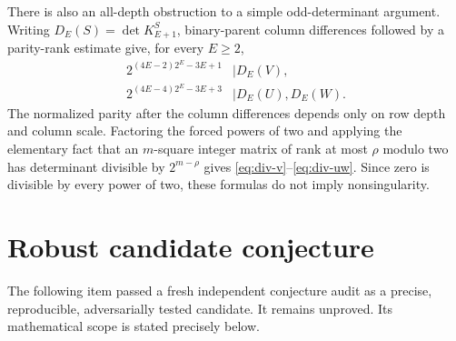 \documentclass[11pt]{amsart}
\theoremstyle{definition}
\begin{document}
There is also an all-depth obstruction to a simple odd-determinant argument.
Writing $D_E(S)=\det K_{E+1}^S$, binary-parent column differences followed by
a parity-rank estimate give, for every $E\geq2$,
\begin{align}
 2^{(4E-2)2^E-3E+1}&\mid D_E(V),\label{eq:div-v}\\
 2^{(4E-4)2^E-3E+3}&\mid D_E(U),D_E(W).
 \label{eq:div-uw}
\end{align}
The normalized parity after the column differences depends only on row depth
and column scale.  Factoring the forced powers of two and applying the
elementary fact that an $m$-square integer matrix of rank at most $\rho$
modulo two has determinant divisible by $2^{m-\rho}$ gives
\eqref{eq:div-v}--\eqref{eq:div-uw}.  Since zero is divisible by every power
of two, these formulas do not imply nonsingularity.

\section{Robust candidate conjecture}\label{sec:conjecture}

The following item passed a fresh independent conjecture audit as a
precise, reproducible, adversarially tested candidate.  It remains unproved.
Its mathematical scope is stated precisely below.
\end{document}

